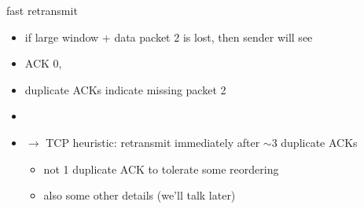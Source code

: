 \begin{frame}{fast retransmit}
    \begin{itemize}
    \item if large window + data packet 2 is lost, then sender will see
    \item ACK 0, 
    \item duplicate ACKs indicate missing packet 2
    \item {}
    \vspace{.5cm}
    \item<2-> $\rightarrow$ TCP heuristic: retransmit immediately after $\sim$3 duplicate ACKs
        \begin{itemize}
        \item not 1 duplicate ACK to tolerate some reordering
        \item also some other details (we'll talk later)
        \end{itemize}
    \end{itemize}
\end{frame}

